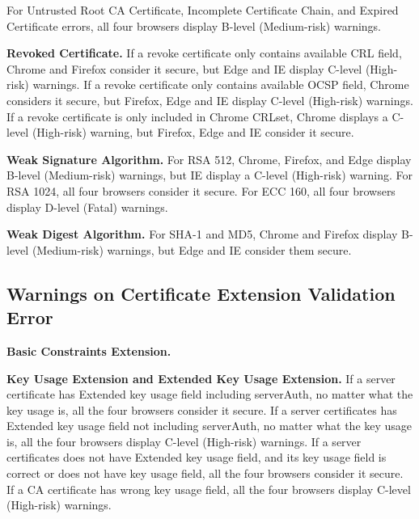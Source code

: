     For Untrusted Root CA Certificate, Incomplete Certificate Chain, and Expired Certificate errors,
        all four browsers display B-level (Medium-risk) warnings.

\textbf{Revoked Certificate.}
    If a revoke certificate only contains available CRL field,
        Chrome and Firefox consider it secure,
            but Edge and IE display C-level (High-risk) warnings.
    If a revoke certificate only contains available OCSP field,
        Chrome considers it secure, but Firefox,
            Edge and IE display C-level (High-risk) warnings.
    If a revoke certificate is only included in Chrome CRLset,
        Chrome displays a C-level (High-risk) warning,
            but Firefox, Edge and IE consider it secure.

\textbf{Weak Signature Algorithm.}
    For RSA 512,
        Chrome, Firefox, and Edge display B-level (Medium-risk) warnings,
            but IE display a C-level (High-risk) warning.
    For RSA 1024,
        all four browsers consider it secure.
    For ECC 160,
        all four browsers display D-level (Fatal) warnings.

\textbf{Weak Digest Algorithm.}
    For SHA-1 and MD5,
        Chrome and Firefox display B-level (Medium-risk) warnings,
            but Edge and IE consider them secure.

\subsection{Warnings on Certificate Extension Validation Error}

\textbf{Basic Constraints Extension.}

\textbf{Key Usage Extension and Extended Key Usage Extension.}
    If a server certificate has Extended key usage field including serverAuth, no matter what the key usage is, 
        all the four browsers consider it secure.
    If a server certificates has Extended key usage field not including serverAuth, no matter what the key usage is, 
        all the four browsers display C-level (High-risk) warnings.
    If a server certificates does not have Extended key usage field, and its key usage field is correct or does not have key usage field,
        all the four browsers consider it secure. 
    If a CA certificate has wrong key usage field, 
        all the four browsers display C-level (High-risk) warnings.


